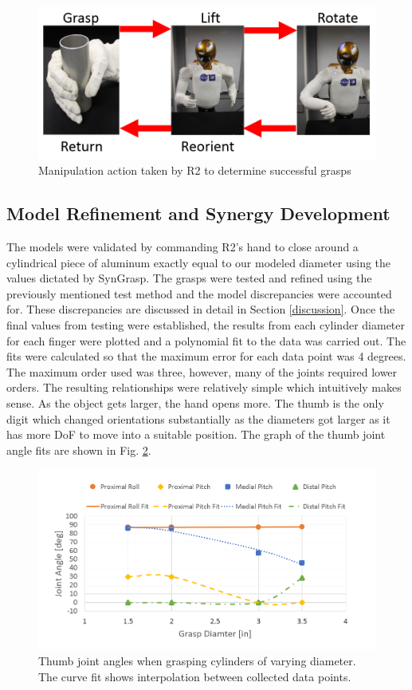 \documentclass[runningheads,a4paper]{llncs}
\begin{document}
\begin{figure}[]
  \centering
  \includegraphics[width=\linewidth]{manipulation}
  \caption{Manipulation action taken by R2 to determine successful grasps}
  \label{testing}
\end{figure}

\subsection{Model Refinement and Synergy Development}
The models were validated by commanding R2's hand to close around a cylindrical piece of aluminum exactly equal to our modeled diameter using the values dictated by SynGrasp. The grasps were tested and refined using the previously mentioned test method and the model discrepancies were accounted for. These discrepancies are discussed in detail in Section \ref{discussion}. Once the final values from testing were established, the results from each cylinder diameter for each finger were plotted and a polynomial fit to the data was carried out. The fits were calculated so that the maximum error for each data point was 4 degrees.   The maximum order used was three, however, many of the joints required lower orders. The resulting relationships were relatively simple which intuitively makes sense. As the object gets larger, the hand opens more. The thumb is the only digit which changed orientations substantially as the diameters got larger as it has more DoF to move into a suitable position. The graph of the thumb joint angle fits are shown in Fig. \ref{thumb_fits}.

\begin{figure}[!b]
  \centering
  \includegraphics[width=1.08\linewidth]{Thumb_Fits_2}
  \caption{Thumb joint angles when grasping cylinders of varying diameter.  The curve fit shows interpolation between collected data points.}
  \label{thumb_fits} 
\end{figure}
\end{document}
